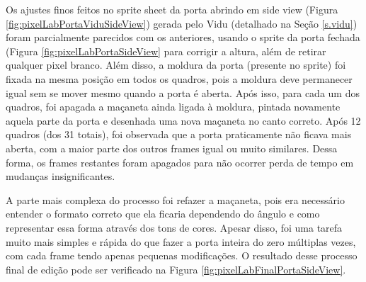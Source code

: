 \begin{figure}[htbp]
\end{figure}

Os ajustes finos feitos no sprite sheet da porta abrindo em side view (Figura \ref{fig:pixelLabPortaViduSideView}) gerada pelo Vidu (detalhado na Seção \ref{s.vidu}) foram parcialmente parecidos com os anteriores, usando o sprite da porta fechada (Figura \ref{fig:pixelLabPortaSideView} para corrigir a altura, além de retirar qualquer pixel branco. Além disso, a moldura da porta (presente no sprite) foi fixada na mesma posição em todos os quadros, pois a moldura deve permanecer igual sem se mover mesmo quando a porta é aberta. Após isso, para cada um dos quadros, foi apagada a maçaneta ainda ligada à moldura, pintada novamente aquela parte da porta e desenhada uma nova maçaneta no canto correto. Após 12 quadros (dos 31 totais), foi observada que a porta praticamente não ficava mais aberta, com a maior parte dos outros frames igual ou muito similares. Dessa forma, os frames restantes foram apagados para não ocorrer perda de tempo em mudanças insignificantes.

A parte mais complexa do processo foi refazer a maçaneta, pois era necessário entender o formato correto que ela ficaria dependendo do ângulo e como representar essa forma através dos tons de cores. Apesar disso, foi uma tarefa muito mais simples e rápida do que fazer a porta inteira do zero múltiplas vezes, com cada frame tendo apenas pequenas modificações. O resultado desse processo final de edição pode ser verificado na Figura \ref{fig:pixelLabFinalPortaSideView}.

